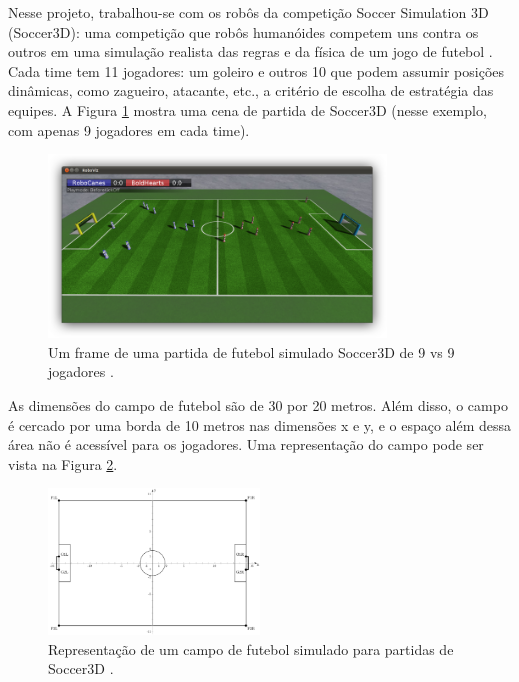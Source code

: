 \documentclass[a4paper,12pt]{article}
\begin{document}
Nesse projeto, trabalhou-se com os robôs da competição Soccer Simulation 3D (Soccer3D): uma competição que robôs humanóides competem uns contra os outros em uma simulação realista das regras e da física de um jogo de futebol \cite{soccer-simulation}. Cada time tem 11 jogadores: um goleiro e outros 10 que podem assumir posições dinâmicas, como zagueiro, atacante, etc., a critério de escolha de estratégia das equipes. A Figura \ref{fig:soccer3d-play} mostra uma cena de partida de Soccer3D (nesse exemplo, com apenas 9 jogadores em cada time).

\begin{figure}[H]
	\centering
	\includegraphics[width=0.8\textwidth]{figures/soccer3d-play.png}
   \caption{Um frame de uma partida de futebol simulado Soccer3D de 9 vs 9 jogadores \cite{soccer-simulation}.} \label{fig:soccer3d-play}
\end{figure}

As dimensões do campo de futebol são de 30 por 20 metros. Além disso, o campo é cercado por uma borda de 10 metros nas dimensões x e y, e o espaço além dessa área não é acessível para os jogadores. Uma representação do campo pode ser vista na Figura \ref{fig:soccer3d_field}.

\begin{figure}[H]
	\centering
	\includegraphics[width=0.5\textwidth]{figures/soccer3d-field.png}
   \caption{Representação de um campo de futebol simulado para partidas de Soccer3D \cite{soccer-simulation}.} \label{fig:soccer3d_field}
\end{figure}
\end{document}
